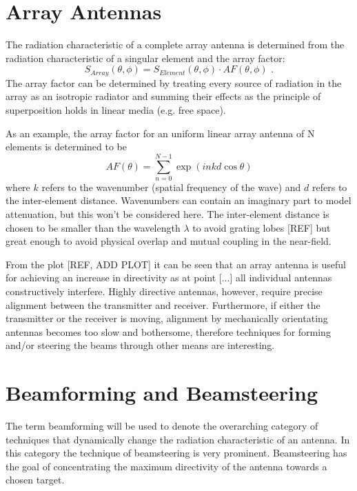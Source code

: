 \documentclass[]{report}
\begin{document}
\section{Array Antennas}
The radiation characteristic of a complete array antenna is determined from the radiation characteristic of a singular element and the array factor:
\begin{equation}
	S_{Array}(\theta, \phi) = S_{Element}(\theta, \phi) \cdot AF(\theta, \phi) \text{ .}
\end{equation}
The array factor can be determined by treating every source of radiation in the array as an isotropic radiator and summing their effects as the principle of superposition holds in linear media (e.g. free space).

As an example, the array factor for an uniform linear array antenna of N elements is determined to be 
\begin{equation}
	AF(\theta) = \sum_{n=0}^{N-1}\exp(inkd\cos\theta)
\end{equation}
where \( k \) refers to the wavenumber (spatial frequency of the wave) and \( d \) refers to the inter-element distance. Wavenumbers can contain an imaginary part to model attenuation, but this won't be considered here. The inter-element distance is chosen to be smaller than the wavelength \( \lambda \) to avoid grating lobes [REF] but great enough to avoid physical overlap and mutual coupling in the near-field.

From the plot [REF, ADD PLOT] it can be seen that an array antenna is useful for achieving an increase in directivity as at point [...] all individual antennas constructively interfere. Highly directive antennas, however, require precise alignment between the transmitter and receiver. Furthermore, if either the transmitter or the receiver is moving, alignment by mechanically orientating antennas becomes too slow and bothersome, therefore techniques for forming and/or steering the beams through other means are interesting.

\section{Beamforming and Beamsteering}

The term beamforming will be used to denote the overarching category of techniques that dynamically change the radiation characteristic of an antenna. In this category the technique of beamsteering is very prominent. Beamsteering has the goal of concentrating the maximum directivity of the antenna towards a chosen target.
\end{document}
